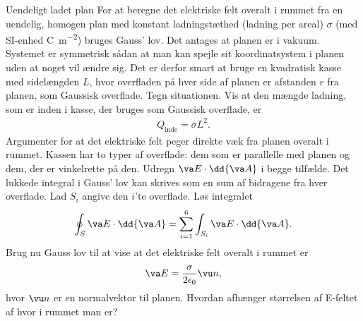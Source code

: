 \begin{opgave}{Uendeligt ladet plan}
    For at beregne det elektriske felt overalt i rummet fra en uendelig, homogen plan med konstant ladningstæthed (ladning per areal) $\sigma$ (med SI-enhed \si{\coulomb\per\meter\squared}) bruges Gauss' lov. Det antages at planen er i vakuum. Systemet er symmetrisk sådan at man kan spejle sit koordinatsystem i planen uden at noget vil ændre sig. Det er derfor smart at bruge en kvadratisk kasse med sidelængden $L$, hvor overfladen på hver side af planen er afstanden $r$ fra planen, som Gaussisk overflade.
    \opg Tegn situationen.
    \opg Vis at den mængde ladning, som er inden i kasse, der bruges som Gaussisk overflade, er
    \begin{align*}
        Q_\mathrm{inde} = \sigma L^2.
    \end{align*}
    \opg Argumenter for at det elektriske felt peger direkte væk fra planen overalt i rummet.
    \opg Kassen har to typer af overflade: dem som er parallelle med planen og dem, der er vinkelrette på den. Udregn $\va E \cdot \dd{\va A}$ i begge tilfælde.
    \opg Det lukkede integral i Gauss' lov kan skrives som en sum af bidragene fra hver overflade. Lad $S_i$ angive den $i$'te overflade. Løs integralet
    \begin{align*}
        \oint_S \va E \cdot \dd{\va A} = \sum_{i=1}^6 \int_{S_i} \va E \cdot \dd{\va A}.
    \end{align*}
    \opg Brug nu Gauss lov til at vise at det elektriske felt overalt i rummet er
    \begin{align*}
        \va E = \frac{\sigma}{2\epsilon_0}\vu n,
    \end{align*}
    hvor $\vu n$ er en normalvektor til planen.
    \opg Hvordan afhænger størrelsen af E-feltet af hvor i rummet man er?
\end{opgave}

